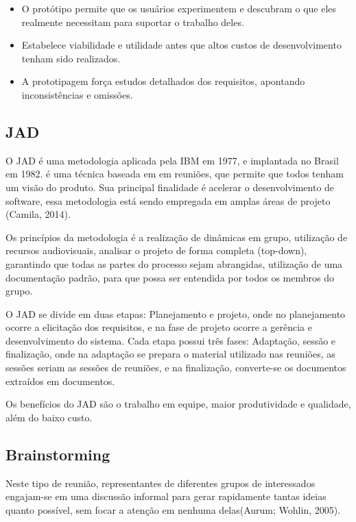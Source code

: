 \begin{itemize}
\item O protótipo permite que os usuários experimentem e descubram o que eles realmente necessitam para suportar o trabalho deles.
\item Estabelece viabilidade e utilidade antes que altos custos de desenvolvimento tenham sido realizados.
\item A prototipagem força estudos detalhados dos requisitos, apontando inconsistências e omissões.
\end{itemize}

\subsection{JAD}

O JAD é uma metodologia aplicada pela IBM em 1977, e implantada no Brasil em 1982. é uma técnica baseada em em reuniões, que permite que todos tenham um visão do produto. Sua principal finalidade é acelerar o desenvolvimento de software, essa metodologia está sendo empregada em amplas áreas de projeto (Camila, 2014).

Os princípios da metodologia é a realização de dinâmicas em grupo, utilização de recursos audiovisuais, analisar o projeto de forma completa (top-down), garantindo que todas as partes do processo sejam abrangidas, utilização de uma documentação padrão, para que possa ser entendida por todos os membros do grupo.

O JAD se divide em duas etapas: Planejamento e projeto, onde no planejamento ocorre a elicitação dos requisitos, e na fase de projeto ocorre a gerência e desenvolvimento do sistema. Cada etapa possui três fases: Adaptação, sessão e finalização, onde na adaptação se prepara o material utilizado nas reuniões, as sessões seriam as sessões de reuniões, e na finalização, converte-se os documentos extraídos em documentos.

Os benefícios do JAD são o trabalho em equipe, maior produtividade e qualidade, além do baixo custo.

\subsection{Brainstorming}

Neste tipo de reunião, representantes de diferentes grupos de interessados engajam-se em uma discussão informal para gerar rapidamente tantas
ideias quanto possível, sem focar a atenção em nenhuma delas(Aurum; Wohlin, 2005).

